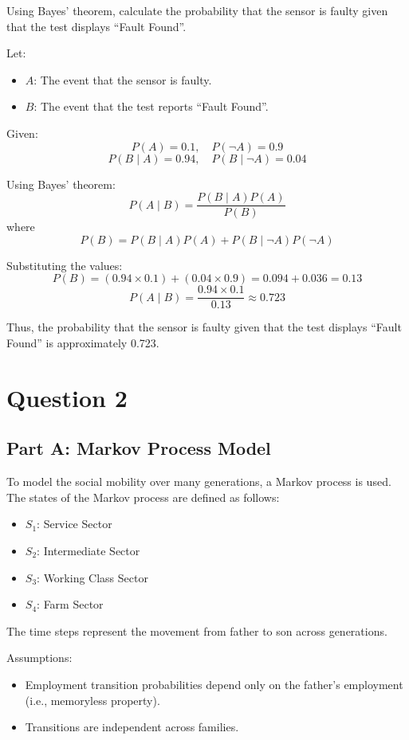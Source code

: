 \documentclass{article}
\begin{document}
	Using Bayes' theorem, calculate the probability that the sensor is faulty given that the test displays ``Fault Found''.
	
	Let:
	\begin{itemize}
		\item $ A $: The event that the sensor is faulty.
		\item $ B $: The event that the test reports ``Fault Found''.
	\end{itemize}
	
	Given:
	\[P(A) = 0.1, \quad P(\neg A) = 0.9\]
	\[P(B \mid A) = 0.94, \quad P(B \mid \neg A) = 0.04\]
	
	Using Bayes' theorem:
	\[P(A \mid B) = \frac{P(B \mid A) P(A)}{P(B)}\]
	where
	\[P(B) = P(B \mid A) P(A) + P(B \mid \neg A) P(\neg A)\]
	
	Substituting the values:
	\[P(B) = (0.94 \times 0.1) + (0.04 \times 0.9) = 0.094 + 0.036 = 0.13\]
	\[P(A \mid B) = \frac{0.94 \times 0.1}{0.13} \approx 0.723\]
	
	Thus, the probability that the sensor is faulty given that the test displays ``Fault Found'' is approximately 0.723.
	
	\section*{Question 2}
	
	\subsection*{Part A: Markov Process Model}
	To model the social mobility over many generations, a Markov process is used. The states of the Markov process are defined as follows:
	\begin{itemize}
		\item $S_1$: Service Sector
		\item $S_2$: Intermediate Sector
		\item $S_3$: Working Class Sector
		\item $S_4$: Farm Sector
	\end{itemize}
	The time steps represent the movement from father to son across generations.
	
	Assumptions:
	\begin{itemize}
		\item Employment transition probabilities depend only on the father's employment (i.e., memoryless property).
		\item Transitions are independent across families.
	\end{itemize}
	
\end{document}
